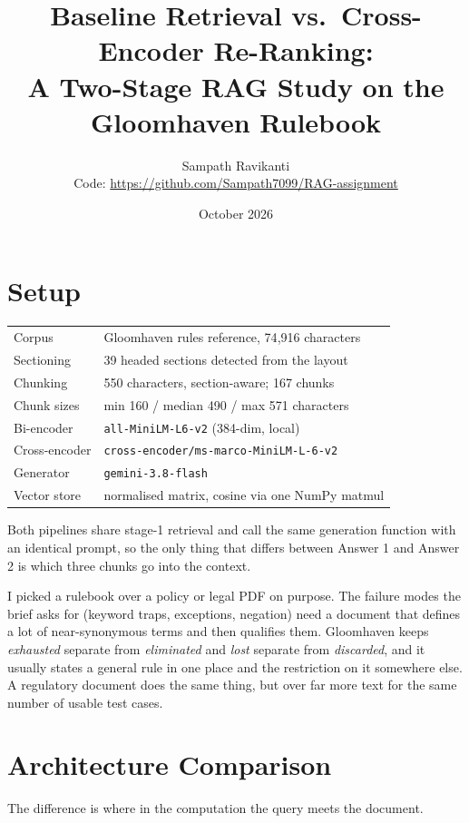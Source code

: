 \documentclass[11pt,a4paper]{article}
\title{Baseline Retrieval vs.\ Cross-Encoder Re-Ranking:\\
       A Two-Stage RAG Study on the Gloomhaven Rulebook}
\author{Sampath Ravikanti\\ \small Code: \url{https://github.com/Sampath7099/RAG-assignment}}
\date{October 2026}
\begin{document}
\maketitle

\section{Setup}

\begin{tabular}{ll}
\toprule
Corpus          & Gloomhaven rules reference, 74{,}916 characters \\
Sectioning      & 39 headed sections detected from the layout \\
Chunking        & 550 characters, section-aware; 167 chunks \\
Chunk sizes     & min 160 / median 490 / max 571 characters \\
Bi-encoder      & \texttt{all-MiniLM-L6-v2} (384-dim, local) \\
Cross-encoder   & \texttt{cross-encoder/ms-marco-MiniLM-L-6-v2} \\
Generator       & \texttt{gemini-3.8-flash} \\
Vector store    & normalised matrix, cosine via one NumPy matmul \\
\bottomrule
\end{tabular}

\medskip
Both pipelines share stage-1 retrieval and call the same generation function with an
identical prompt, so the only thing that differs between Answer 1 and Answer 2 is which
three chunks go into the context.

I picked a rulebook over a policy or legal PDF on purpose. The failure modes the brief asks
for (keyword traps, exceptions, negation) need a document that defines a lot of
near-synonymous terms and then qualifies them. Gloomhaven keeps \emph{exhausted} separate
from \emph{eliminated} and \emph{lost} separate from \emph{discarded}, and it usually states
a general rule in one place and the restriction on it somewhere else. A regulatory document
does the same thing, but over far more text for the same number of usable test cases.

\section{Architecture Comparison}

The difference is where in the computation the query meets the document.
\end{document}
